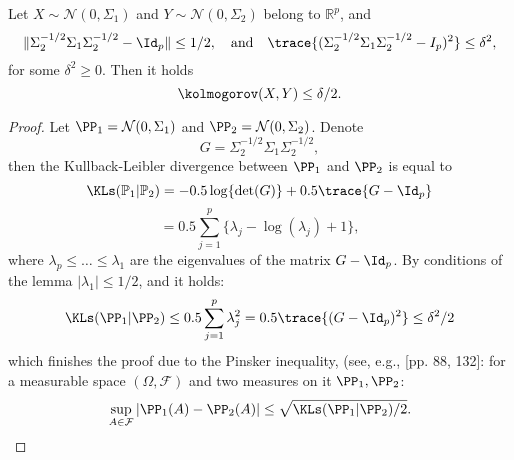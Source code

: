 \begin{lemma}
\label{Pinsker}
Let $X \sim \mathcal{N}(0, \Sigma_1)$ and $Y \sim \mathcal{N}(0, \Sigma_2)$ belong to $\mathbb{R}^p$, and  
\[
\| \Sigma_2^{-1/2} \Sigma_1 \Sigma_2^{-1/2} - \Id_p \| \leq 1/2, \quad \text{and} \quad \trace \{ (\Sigma_2^{-1/2} \Sigma_1 \Sigma_2^{-1/2} - I_p)^2 \} \leq \delta^2,
\]
for some $\delta^2 \geq 0$. Then it holds  
\[
\kolmogorov(X, Y) \leq \delta/2.
\]
\end{lemma}
\begin{proof}
   Let $\PP_1 = \mathcal{N}(0, \Sigma_1)$ and $\PP_2 = \mathcal{N}(0, \Sigma_2)$. Denote  
\[
G = \Sigma_2^{-1/2} \Sigma_1 \Sigma_2^{-1/2},
\]
then the Kullback-Leibler divergence between $\PP_1$ and $\PP_2$ is equal to  
\[
\KLs(\mathbb{P}_1 | \mathbb{P}_2) = -0.5 \log \{\det(G)\} + 0.5 \trace \{ G - \Id_p \}
\]
\[
= 0.5 \sum_{j=1}^{p} \{\lambda_j - \log(\lambda_j) + 1\},
\]
where $\lambda_p \leq \dots \leq \lambda_1$ are the eigenvalues of the matrix $G - \Id_p$. By conditions of the lemma $|\lambda_1| \leq 1/2$, and it holds:  
\[
\KLs(\PP_1| \PP_2) \leq 0.5 \sum_{j=1}^{p} \lambda_j^2 = 0.5 \trace \{ (G - \Id_p)^2 \} \leq \delta^2 / 2
\]
which finishes the proof due to the Pinsker inequality, 
(see, e.g., \citep{Tsybakov}[pp. 88, 132]: for a measurable space $(\Omega, \mathcal{F})$ and two measures on it $\PP_1, \PP_2$:
\[
\sup_{A \in \mathcal{F}} \left| \PP_1(A) - \PP_2(A) \right| \leq \sqrt{\KLs(\PP_1 | \PP_2)/2}.
\]
\end{proof} 

